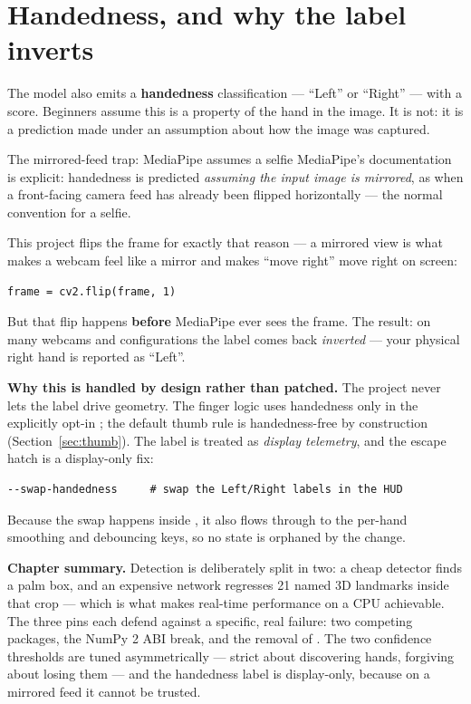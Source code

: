 \section{Handedness, and why the label inverts}

The model also emits a \textbf{handedness} classification --- ``Left'' or ``Right'' --- with a score.
Beginners assume this is a property of the hand in the image. It is not: it is a prediction made
under an assumption about how the image was captured.

\begin{edgetrap}{The mirrored-feed trap: MediaPipe assumes a selfie}
MediaPipe's documentation is explicit: handedness is predicted \emph{assuming the input image is
mirrored}, as when a front-facing camera feed has already been flipped horizontally --- the normal
convention for a selfie.

This project flips the frame for exactly that reason --- a mirrored view is what makes a webcam feel
like a mirror and makes ``move right'' move right on screen:

\begin{lstlisting}
frame = cv2.flip(frame, 1)
\end{lstlisting}

But that flip happens \textbf{before} MediaPipe ever sees the frame. The result: on many webcams and
configurations the label comes back \emph{inverted} --- your physical right hand is reported as
``Left''.

\textbf{Why this is handled by design rather than patched.} The project never lets the label drive
geometry. The finger logic uses handedness only in the explicitly opt-in ; the
default thumb rule is handedness-free by construction (Section~\ref{sec:thumb}). The label is
treated as \emph{display telemetry}, and the escape hatch is a display-only fix:

\begin{lstlisting}
--swap-handedness     # swap the Left/Right labels in the HUD
\end{lstlisting}

Because the swap happens inside , it also flows through to the per-hand
smoothing and debouncing keys, so no state is orphaned by the change.
\end{edgetrap}

\begin{keyidea}
\textbf{Chapter summary.} Detection is deliberately split in two: a cheap detector finds a palm box,
and an expensive network regresses 21 named 3D landmarks inside that crop --- which is what makes
real-time performance on a CPU achievable. The three pins each defend against a specific, real
failure: two competing  packages, the NumPy 2 ABI break, and the removal of
. The two confidence thresholds are tuned asymmetrically --- strict about
discovering hands, forgiving about losing them --- and the handedness label is display-only, because
on a mirrored feed it cannot be trusted.
\end{keyidea}
